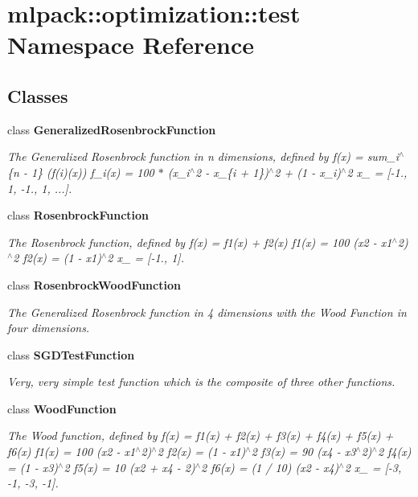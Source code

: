 \section{mlpack\-:\-:optimization\-:\-:test Namespace Reference}
\label{namespacemlpack_1_1optimization_1_1test}
\subsection*{Classes}
\begin{DoxyCompactItemize}
\item 
class {\bf Generalized\-Rosenbrock\-Function}
\begin{DoxyCompactList}\small\item\em The Generalized Rosenbrock function in n dimensions, defined by f(x) = sum\-\_\-i$^\wedge$\{n -\/ 1\} (f(i)(x)) f\-\_\-i(x) = 100 $\ast$ (x\-\_\-i$^\wedge$2 -\/ x\-\_\-\{i + 1\})$^\wedge$2 + (1 -\/ x\-\_\-i)$^\wedge$2 x\-\_ = [-\/1., 1, -\/1., 1, ...]. \end{DoxyCompactList}\item 
class {\bf Rosenbrock\-Function}
\begin{DoxyCompactList}\small\item\em The Rosenbrock function, defined by f(x) = f1(x) + f2(x) f1(x) = 100 (x2 -\/ x1$^\wedge$2)$^\wedge$2 f2(x) = (1 -\/ x1)$^\wedge$2 x\-\_ = [-\/1., 1]. \end{DoxyCompactList}\item 
class {\bf Rosenbrock\-Wood\-Function}
\begin{DoxyCompactList}\small\item\em The Generalized Rosenbrock function in 4 dimensions with the Wood Function in four dimensions. \end{DoxyCompactList}\item 
class {\bf S\-G\-D\-Test\-Function}
\begin{DoxyCompactList}\small\item\em Very, very simple test function which is the composite of three other functions. \end{DoxyCompactList}\item 
class {\bf Wood\-Function}
\begin{DoxyCompactList}\small\item\em The Wood function, defined by f(x) = f1(x) + f2(x) + f3(x) + f4(x) + f5(x) + f6(x) f1(x) = 100 (x2 -\/ x1$^\wedge$2)$^\wedge$2 f2(x) = (1 -\/ x1)$^\wedge$2 f3(x) = 90 (x4 -\/ x3$^\wedge$2)$^\wedge$2 f4(x) = (1 -\/ x3)$^\wedge$2 f5(x) = 10 (x2 + x4 -\/ 2)$^\wedge$2 f6(x) = (1 / 10) (x2 -\/ x4)$^\wedge$2 x\-\_ = [-\/3, -\/1, -\/3, -\/1]. \end{DoxyCompactList}\end{DoxyCompactItemize}
